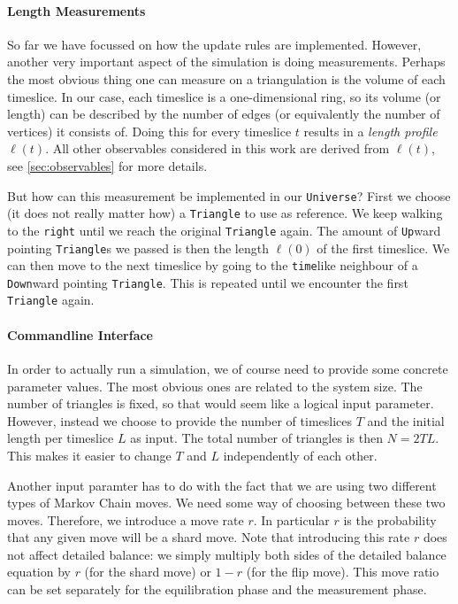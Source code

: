 \paragraph{Length Measurements}

So far we have focussed on how the update rules are implemented. However, another very important aspect of the simulation is doing measurements. Perhaps the most obvious thing one can measure on a triangulation is the volume of each timeslice. In our case, each timeslice is a one-dimensional ring, so its volume (or length) can be described by the number of edges (or equivalently the number of vertices) it consists of. Doing this for every timeslice $t$ results in a \emph{length profile} $\ell(t)$. All other observables considered in this work are derived from $\ell(t)$, see \ref{sec:observables} for more details.

But how can this measurement be implemented in our \verb|Universe|? First we choose (it does not really matter how) a \verb|Triangle| to use as reference. We keep walking to the \verb|right| until we reach the original \verb|Triangle| again. The amount of \verb|Up|ward pointing \verb|Triangle|s we passed is then the length $\ell(0)$ of the first timeslice. We can then move to the next timeslice by going to the \verb|time|like neighbour of a \verb|Down|ward pointing \verb|Triangle|. This is repeated until we encounter the first \verb|Triangle| again.

\paragraph{Commandline Interface}
In order to actually run a simulation, we of course need to provide some concrete parameter values. The most obvious ones are related to the system size. The number of triangles is fixed, so that would seem like a logical input parameter. However, instead we choose to provide the number of timeslices $T$ and the initial length per timeslice $L$ as input. The total number of triangles is then $N = 2 T L$. This makes it easier to change $T$ and $L$ independently of each other.

Another input paramter has to do with the fact that we are using two different types of Markov Chain moves. We need some way of choosing between these two moves. Therefore, we introduce a move rate $r$. In particular $r$ is the probability that any given move will be a shard move. Note that introducing this rate $r$ does not affect detailed balance: we simply multiply both sides of the detailed balance equation by $r$ (for the shard move) or $1 - r$ (for the flip move). This move ratio can be set separately for the equilibration phase and the measurement phase.

